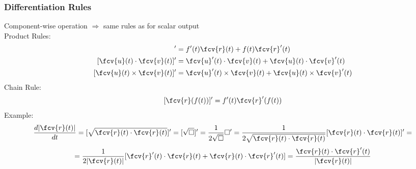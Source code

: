 \begin{frame}
\frametitle{Differentiation Rules}
Component-wise operation $\Longrightarrow$ same rules as for scalar output\\
  \pause Product Rules:
   \begin{align*}
   [f(t) \fcv{r}(t)]' & = f'(t) \fcv{r}(t) + f(t) \fcv{r}'(t) \\
   [\fcv{u}(t)\cdot \fcv{v}(t)]' & = \fcv{u}'(t)\cdot \fcv{v}(t) + \fcv{u}(t)
\cdot \fcv{v}'(t) \\
   [\fcv{u}(t)\times \fcv{v}(t)]' & = \fcv{u}'(t) \times \fcv{v}(t) +
\fcv{u}(t)\times \fcv{v}'(t)
 \end{align*}
  \pause Chain Rule:
  $$[\fcv{r}(f(t))]' = f'(t) \fcv{r}'(f(t))$$
    \pause Example:
    $$\frac{d |\fcv{r}(t)|}{dt} =
    [\sqrt{\fcv{r}(t)\cdot \fcv{r}(t)}]' = [\sqrt{\Box}]' =
    \frac{1}{2\sqrt{\Box}} \Box' =
    \frac{1}{2\sqrt{\fcv{r}(t)\cdot \fcv{r}(t)}}
    [\fcv{r}(t)\cdot \fcv{r}(t)]' = $$
    $$= \frac{1}{2|\fcv{r}(t)|}
    [\fcv{r}'(t)\cdot \fcv{r}(t) +
    \fcv{r}(t)\cdot \fcv{r}'(t)] = \frac{\fcv{r}(t)\cdot \fcv{r}'(t)}{|\fcv{r}(t)|}$$
\end{frame}